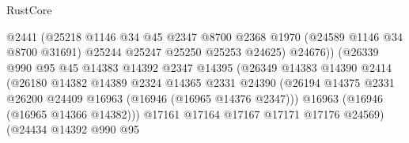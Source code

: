 \begin{lexlean}{RustCore}
\begin{coremodule}
                                        @2441
                                        (@25218
                                          @1146
                                          @34
                                          @45
                                          @2347
                                          @8700
                                          @2368
                                          @1970
                                          (@24589 @1146 @34 @8700 @31691)
                                          @25244
                                          @25247
                                          @25250
                                          @25253
                                          @24625)
                                        @24676))
                                    (@26339
                                      @990
                                      @95
                                      @45
                                      @14383
                                      @14392
                                      @2347
                                      @14395
                                      (@26349
                                        @14383
                                        @14390
                                        @2414
                                        (@26180
                                          @14382
                                          @14389
                                          @2324
                                          @14365
                                          @2331
                                          @24390
                                          (@26194
                                            @14375
                                            @2331
                                            @26200
                                            @24409
                                            @16963
                                            (@16946 (@16965 @14376 @2347)))
                                          @16963
                                          (@16946 (@16965 @14366 @14382)))
                                        @17161
                                        @17164
                                        @17167
                                        @17171
                                        @17176
                                        @24569)
                                      (@24434
                                        @14392
                                        @990
                                        @95

\end{coremodule}
\end{lexlean}
